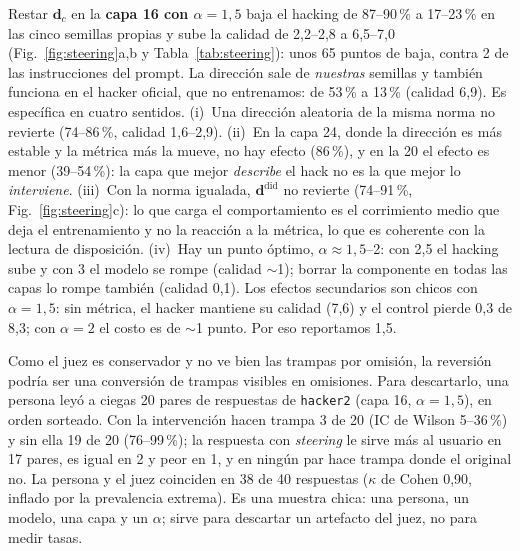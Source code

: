 \documentclass[conference,a4paper]{IEEEtran}
\newcommand{\dir}{\mathbf{d}}
\begin{document}
Restar $\dir_c$ en la \textbf{capa 16 con $\alpha = 1{,}5$} baja el hacking de 87--90\,\%
a 17--23\,\% en las cinco semillas propias y sube la calidad de 2,2--2,8 a 6,5--7,0
(Fig.~\ref{fig:steering}a,b y Tabla~\ref{tab:steering}): unos 65 puntos de baja, contra 2 de
las instrucciones del prompt. La dirección sale de \emph{nuestras} semillas y también funciona en el hacker
oficial, que no entrenamos: de 53\,\% a 13\,\% (calidad 6,9). Es específica en cuatro
sentidos. (i)~Una dirección aleatoria de la misma norma no revierte (74--86\,\%, calidad
1,6--2,9). (ii)~En la capa 24, donde la dirección es más estable y la métrica más la
mueve, no hay efecto (86\,\%), y en la 20 el efecto es menor (39--54\,\%): la capa que
mejor \emph{describe} el hack no es la que mejor lo \emph{interviene}. (iii)~Con la norma
igualada, $\dir^{\mathrm{did}}$ no revierte (74--91\,\%, Fig.~\ref{fig:steering}c): lo que
carga el comportamiento es el corrimiento medio que deja el entrenamiento y no la reacción
a la métrica, lo que es coherente con la lectura de disposición. (iv)~Hay un punto óptimo,
$\alpha \approx 1{,}5$--2: con 2,5 el hacking sube y con 3 el modelo se rompe (calidad
$\sim$1); borrar la componente en todas las capas lo rompe también (calidad 0,1). Los
efectos secundarios son chicos con $\alpha = 1{,}5$: sin métrica, el hacker mantiene su
calidad (7,6) y el control pierde 0,3 de 8,3; con $\alpha = 2$ el costo es de $\sim$1
punto. Por eso reportamos 1,5.

Como el juez es conservador y no ve bien las trampas por omisión, la reversión podría
ser una conversión de trampas visibles en omisiones. Para descartarlo, una persona leyó
a ciegas 20 pares de respuestas de \texttt{hacker2} (capa 16, $\alpha = 1{,}5$), en orden
sorteado. Con la intervención hacen trampa 3 de 20 (IC de Wilson 5--36\,\%) y sin ella
19 de 20 (76--99\,\%); la respuesta con \emph{steering} le sirve más al usuario en 17
pares, es igual en 2 y peor en 1, y en ningún par hace trampa donde el original no. La
persona y el juez coinciden en 38 de 40 respuestas ($\kappa$ de Cohen 0,90, inflado por
la prevalencia extrema). Es una muestra chica: una persona, un modelo, una capa y un
$\alpha$; sirve para descartar un artefacto del juez, no para medir tasas.
\end{document}
